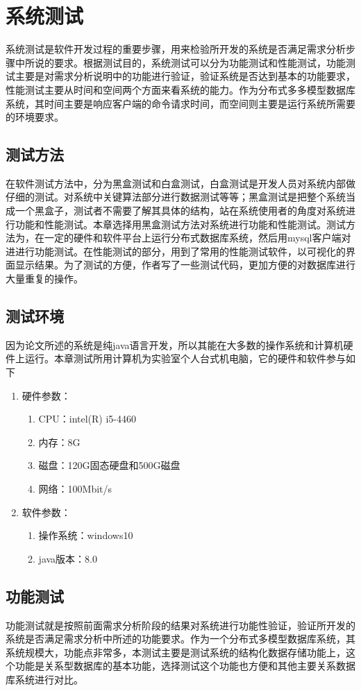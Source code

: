 
\chapter{系统测试}
系统测试是软件开发过程的重要步骤，用来检验所开发的系统是否满足需求分析步骤中所说的要求。根据测试目的，系统测试可以分为功能测试和性能测试，功能测试主要是对需求分析说明中的功能进行验证，验证系统是否达到基本的功能要求，性能测试主要从时间和空间两个方面来看系统的能力。作为分布式多多模型数据库系统，其时间主要是响应客户端的命令请求时间，而空间则主要是运行系统所需要的环境要求。
\section{测试方法}
在软件测试方法中，分为黑盒测试和白盒测试，白盒测试是开发人员对系统内部做仔细的测试。对系统中关键算法部分进行数据测试等等；黑盒测试是把整个系统当成一个黑盒子，测试者不需要了解其具体的结构，站在系统使用者的角度对系统进行功能和性能测试。本章选择用黑盒测试方法对系统进行功能和性能测试。测试方法为，在一定的硬件和软件平台上运行分布式数据库系统，然后用mysql客户端对进进行功能测试。在性能测试的部分，用到了常用的性能测试软件，以可视化的界面显示结果。为了测试的方便，作者写了一些测试代码，更加方便的对数据库进行大量重复的操作。
\section{测试环境}
因为论文所述的系统是纯java语言开发，所以其能在大多数的操作系统和计算机硬件上运行。本章测试所用计算机为实验室个人台式机电脑，它的硬件和软件参与如下
\begin{enumerate}
	\item 硬件参数：
	\begin{enumerate}
		\item CPU：intel(R) i5-4460
		\item 内存：8G
		\item 磁盘：120G固态硬盘和500G磁盘
		\item 网络：100Mbit/s
	\end{enumerate}
\item 软件参数：
\begin{enumerate}
	\item 操作系统：windows10
	\item java版本：8.0
\end{enumerate}
\end{enumerate}
\section{功能测试}
功能测试就是按照前面需求分析阶段的结果对系统进行功能性验证，验证所开发的系统是否满足需求分析中所述的功能要求。作为一个分布式多模型数据库系统，其系统规模大，功能点非常多，本测试主要是测试系统的结构化数据存储功能上，这个功能是关系型数据库的基本功能，选择测试这个功能也方便和其他主要关系数据库系统进行对比。
